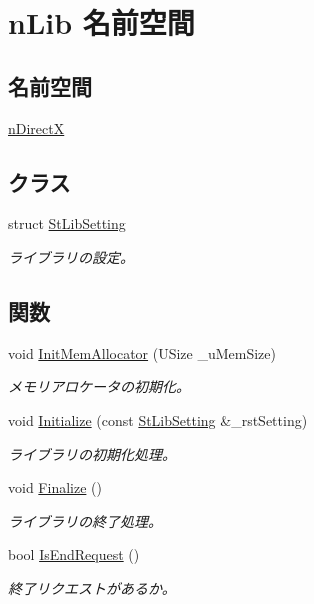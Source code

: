 \hypertarget{namespacen_lib}{}\section{n\+Lib 名前空間}
\label{namespacen_lib}
\subsection*{名前空間}
\begin{DoxyCompactItemize}
\item 
 \hyperlink{namespacen_lib_1_1n_direct_x}{n\+Direct\+X}
\end{DoxyCompactItemize}
\subsection*{クラス}
\begin{DoxyCompactItemize}
\item 
struct \hyperlink{structn_lib_1_1_st_lib_setting}{St\+Lib\+Setting}
\begin{DoxyCompactList}\small\item\em ライブラリの設定。 \end{DoxyCompactList}\end{DoxyCompactItemize}
\subsection*{関数}
\begin{DoxyCompactItemize}
\item 
void \hyperlink{namespacen_lib_a392a158d6ad2b21d098ec6eb669ed06c}{Init\+Mem\+Allocator} (U\+Size \+\_\+u\+Mem\+Size)
\begin{DoxyCompactList}\small\item\em メモリアロケータの初期化。 \end{DoxyCompactList}\item 
void \hyperlink{namespacen_lib_a6846b79576336adc07122ef5c2770783}{Initialize} (const \hyperlink{structn_lib_1_1_st_lib_setting}{St\+Lib\+Setting} \&\+\_\+rst\+Setting)
\begin{DoxyCompactList}\small\item\em ライブラリの初期化処理。 \end{DoxyCompactList}\item 
void \hyperlink{namespacen_lib_a3209c494611928a27a500a408e3defef}{Finalize} ()
\begin{DoxyCompactList}\small\item\em ライブラリの終了処理。 \end{DoxyCompactList}\item 
bool \hyperlink{namespacen_lib_ab595f1979af93fc48b349c380d2c55cb}{Is\+End\+Request} ()
\begin{DoxyCompactList}\small\item\em 終了リクエストがあるか。 \end{DoxyCompactList}\end{DoxyCompactItemize}


